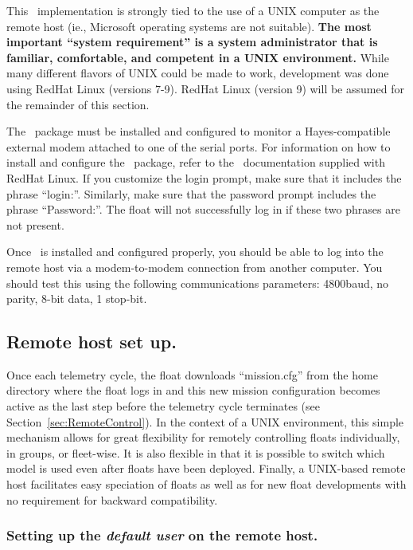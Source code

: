 This \iridium\ implementation is strongly tied to the use of a UNIX computer
as the remote host (ie., Microsoft operating systems are not suitable).
\textbf{The most important ``system requirement'' is a system administrator
  that is familiar, comfortable, and competent in a UNIX environment.}
While many different flavors of UNIX could be made to work, development was
done using RedHat Linux (versions 7-9).  RedHat Linux (version 9) will be
assumed for the remainder of this section.

The \mgetty\ package must be installed and configured to monitor a
Hayes-compatible external modem attached to one of the serial ports.  For
information on how to install and configure the \mgetty\ package, refer to
the \mgetty\ documentation supplied with RedHat Linux.  If you customize the
login prompt, make sure that it includes the phrase ``login:''.  Similarly,
make sure that the password prompt includes the phrase ``Password:''.  The
float will not successfully log in if these two phrases are not present.

Once \mgetty\ is installed and configured properly, you should be able to log
into the remote host via a modem-to-modem connection from another computer.
You should test this using the following communications parameters:
4800baud, no parity, 8-bit data, 1 stop-bit.

\subsection{Remote host set up.} 
\label{sec:RemoteHostSetUp} 

Once each telemetry cycle, the float downloads ``mission.cfg'' from the home
directory where the float logs in and this new mission configuration becomes
active as the last step before the telemetry cycle terminates (see
Section~\ref{sec:RemoteControl}).  In the context of a UNIX environment,
this simple mechanism allows for great flexibility for remotely controlling
floats individually, in groups, or fleet-wise.  It is also flexible in that
it is possible to switch which model is used even after floats have been
deployed.  Finally, a UNIX-based remote host facilitates easy speciation of
floats as well as for new float developments with no requirement for
backward compatibility.

\subsubsection{Setting up the \emph{default user} on the remote host.}
\label{sec:RemoteHostDefaultUser}

